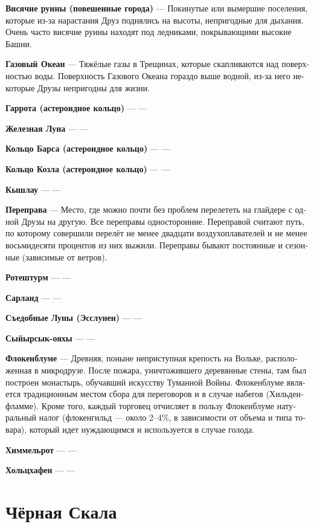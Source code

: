 \documentclass[a4paper,12pt,fleqn]{book}\usepackage{polyglossia}\setdefaultlanguage[babelshorthands=true]{russian}\setotherlanguage{english}\defaultfontfeatures{Ligatures=TeX,Mapping=tex-text}\usepackage{xcolor}\newcommand{\ml}[3]{#2}
\newcommand{\asterism}{\vspace{1em}{\centering\Large\bfseries$\ast~\ast~\ast$\par}\vspace{1em}}
\newcommand{\theterm}[3]{\textbf{\hypertarget{#1}{#2}} --- #3}
\begin{document}
\asterism

\theterm{townhenge}
{Висячие руины (повешенные города)}
{Покинутые или вымершие поселения, которые из-за нарастания Друз поднялись на высоты, непригодные для дыхания.
Очень часто висячие руины находят под ледниками, покрывающими высокие Башни.}

\theterm{gas-ocean}
{Газовый Океан}
{Тяжёлые газы в Трещинах, которые скапливаются над поверхностью воды.
Поверхность Газового Океана гораздо выше водной, из-за него некоторые Друзы непригодны для жизни.}

\theterm{garrota}
{Гаррота (астероидное кольцо)}
{---}

\theterm{eisenloon}
{Железная Луна}
{---}

\theterm{ounce-ring}
{Кольцо Барса (астероидное кольцо)}
{---}

\theterm{goat-ring}
{Кольцо Козла (астероидное кольцо)}
{---}

\theterm{qyschlau}
{Кышлау}
{---}

\theterm{crossing}
{Переправа}
{Место, где можно почти без проблем перелететь на глайдере с одной Друзы на другую.
Все переправы односторонние.
Переправой считают путь, по которому совершили перелёт не менее двадцати воздухоплавателей и не менее восьмидесяти процентов из них выжили.
Переправы бывают постоянные и сезонные (зависимые от ветров).}

\theterm{rotesturm}
{Ротештурм}
{---}

\theterm{sarland}
{Сарланд}
{---}

\theterm{essloonen}
{Съедобные Луны (Эсслунен)}{---}

\theterm{syjyrsyq-oiahy}
{Сыйырсык-ояхы}{---}

\theterm{flockenblume}
{Флокенблуме}
{Древняя, поныне неприступная крепость на Вольке, расположенная в микродрузе. После пожара, уничтожившего деревянные стены, там был построен монастырь, обучавший искусству Туманной Войны. Флокенблуме является традиционным местом сбора для переговоров и в случае набегов (Хильденфламме). Кроме того, каждый торговец отчисляет в пользу Флокенблуме натуральный налог (флокенгильд --- около 2--4\%, в зависимости от объема и типа товара), который идет нуждающимся и используется в случае голода.}

\theterm{himmelrot}
{Химмельрот}
{---}

\theterm{holzhafen}
{Хольцхафен}
{---}

\section{Чёрная Скала}
\end{document}
